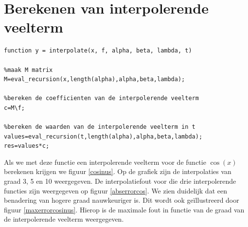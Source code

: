 \documentclass[a4paper, 12pt, titlepage]{report}
\begin{document}
\section{Berekenen van interpolerende veelterm}
\begin{lstlisting}
function y = interpolate(x, f, alpha, beta, lambda, t)

%maak M matrix
M=eval_recursion(x,length(alpha),alpha,beta,lambda);

%bereken de coefficienten van de interpolerende veelterm
c=M\f;

%bereken de waarden van de interpolerende veelterm in t
values=eval_recursion(t,length(alpha),alpha,beta,lambda);
res=values*c;
\end{lstlisting}
Als we met deze functie een interpolerende veelterm voor de functie $\cos(x)$ berekenen krijgen we figuur \ref{cosinus}. Op de grafiek zijn de interpolaties van graad 3, 5 en 10 weergegeven. De interpolatiefout voor die drie interpolerende functies zijn weergegeven op figuur \ref{abserrorcos}. We zien duidelijk dat een benadering van hogere graad nauwkeuriger is. Dit wordt ook ge\"illustreerd door figuur \ref{maxerrorcosinus}. Hierop is de maximale fout in functie van de graad van de interpolerende veelterm weergegeven. \\
\end{document}
